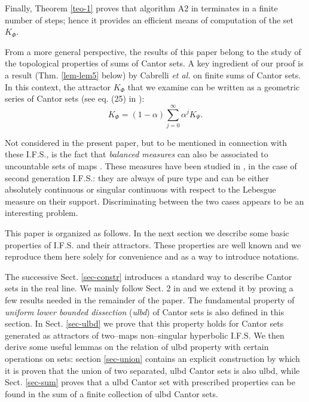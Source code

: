 \documentclass[final,epsfig,amsfont]{article}
\begin{document}
Finally, Theorem \ref{teo-1} proves that algorithm A2 in \cite{intj} terminates in a finite number of steps; hence it provides an efficient means of computation of the set $K_\Phi$.

From a more general perspective, the results of this paper belong to the study of the topological properties of sums of Cantor sets. A key ingredient of our proof is a result (Thm. \ref{lem-lem5} below) by Cabrelli {\em et al.} \cite{cabrelli} on finite sums of Cantor sets. In this context, the attractor $K_\Phi$ that we examine can be written as a geometric series of Cantor sets (see eq. (25) in \cite{intj}):
\begin{equation}
K_\Phi =  (1-\alpha) \sum_{j=0}^\infty  \alpha^j K_\Psi.
 \label{fan2}
\end{equation}

Not considered in the present paper, but to be mentioned in connection with these I.F.S., is the fact that {\em balanced measures} can also be associated to uncountable sets of maps \cite{elton,mendiv}. These measures have been studied in \cite{nalgo2,arxiv}, in the case of second generation I.F.S.: they are always of pure type and can be either absolutely continuous or singular continuous with respect to the Lebesgue measure on their support. Discriminating between the two cases appears to be an interesting problem.

This paper is organized as follows. In the next section we describe some basic properties of I.F.S. and their attractors. These properties are well known and we reproduce them here solely for convenience and as a way to introduce notations.

The successive Sect. \ref{sec-constr} introduces a standard way to describe Cantor sets in the real line. We mainly follow Sect. 2 in \cite{cabrelli} and we extend it by proving a few results needed in the remainder of the paper. The fundamental property of {\em uniform lower bounded dissection} ({\em ulbd}) of Cantor sets is also defined in this section. In Sect. \ref{sec-ulbd} we prove that this property holds for Cantor sets generated as attractors of two--maps non--singular hyperbolic I.F.S. We then derive some useful lemmas on the relation of ulbd property with certain operations on sets: section \ref{sec-union} contains an explicit construction by which it is proven that the union of two separated, ulbd Cantor sets is also ulbd, while Sect. \ref{sec-sum} proves that a ulbd Cantor set with prescribed properties can be found in the sum of a finite collection of ulbd Cantor sets.
\end{document}
